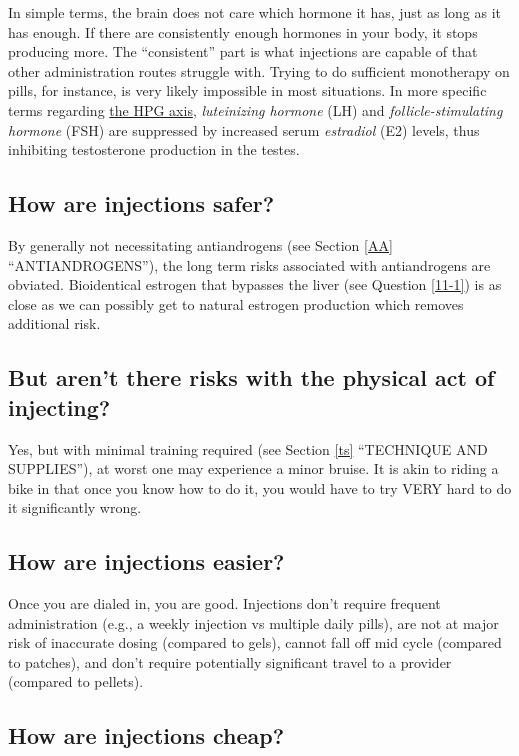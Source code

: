 \documentclass{article}
\begin{document}
In simple terms, the brain does not care which hormone it has, just as long as it has enough. If there are consistently enough hormones in your body, it stops producing more. The “consistent” part is what injections are capable of that other administration routes struggle with. Trying to do sufficient monotherapy on pills, for instance, is very likely impossible in most situations. In more specific terms regarding \href{https://en.wikipedia.org/wiki/Hypothalamic-pituitary-gonadal_axis}{the HPG axis}, \textit{luteinizing hormone} (LH) and \textit{follicle-stimulating hormone} (FSH) are suppressed by increased serum \textit{estradiol} (E2) levels, thus inhibiting testosterone production in the testes.

\subsection{How are injections safer?}

By generally not necessitating antiandrogens (see Section \ref{AA} “ANTIANDROGENS”), the long term risks associated with antiandrogens are obviated. Bioidentical estrogen that bypasses the liver (see Question \ref{11-1}) is as close as we can possibly get to natural estrogen production which removes additional risk.

\subsection{But aren’t there risks with the physical act of injecting?}

Yes, but with minimal training required (see Section \ref{ts} “TECHNIQUE AND SUPPLIES”), at worst one may experience a minor bruise. It is akin to riding a bike in that once you know how to do it, you would have to try VERY hard to do it significantly wrong.

\subsection{How are injections easier?}

Once you are dialed in, you are good. Injections don’t require frequent administration (e.g., a weekly injection vs multiple daily pills), are not at major risk of inaccurate dosing (compared to gels), cannot fall off mid cycle (compared to patches), and don’t require potentially significant travel to a provider (compared to pellets).

\subsection{How are injections cheap?}
\end{document}
